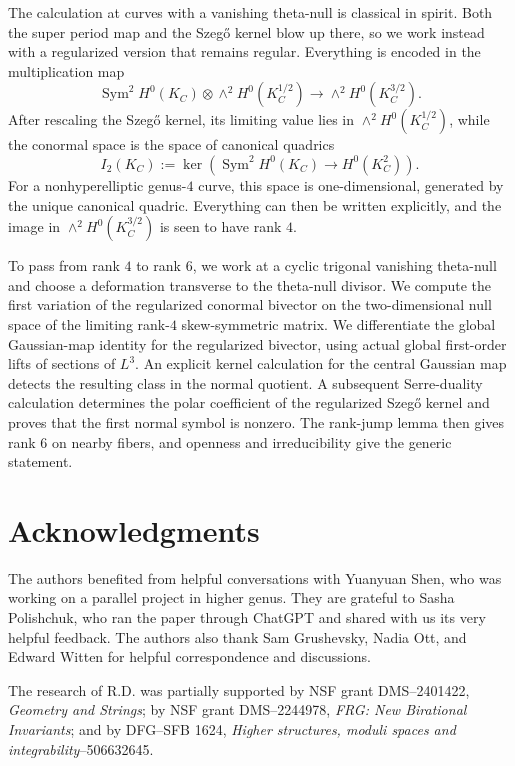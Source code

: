 \documentclass[11pt]{article}
\newcommand{\Sym}{\operatorname{Sym}}
\begin{document}
The calculation at curves with a vanishing theta-null is classical in spirit.
Both the super period map and the Szeg\H{o} kernel blow up there,
so we work instead with a regularized version that remains regular.
Everything is encoded in the multiplication map
\[
\Sym^2 H^0(K_C)\otimes \wedge^2 H^0(K_C^{1/2})
\longrightarrow
\wedge^2 H^0(K_C^{3/2}).
\]
After rescaling the Szeg\H{o} kernel, its limiting value lies in
$\wedge^2 H^0(K_C^{1/2})$, while the conormal space is the space of canonical quadrics
\[
I_2(K_C):=\ker\!\left(
\operatorname{Sym}^2 H^0(K_C)\longrightarrow H^0(K_C^2)
\right).
\]
{For a nonhyperelliptic genus-$4$ curve,} this space is one-dimensional, generated by the unique canonical quadric.
Everything can then be written explicitly, and the image in
$\wedge^2 H^0(K_C^{3/2})$ is seen to have rank $4$.

To pass from rank $4$ to rank $6$, we work at a cyclic trigonal vanishing theta-null
and choose a deformation transverse to the theta-null divisor.  We compute the first variation
of the {regularized conormal bivector} on the two-dimensional null space of the limiting rank-$4$ skew-symmetric matrix.
\begingroup
We differentiate the global Gaussian-map identity for the regularized
bivector, using actual global first-order lifts of sections of $L^3$.
An explicit kernel calculation for the central Gaussian map detects the
resulting class in the normal quotient. A subsequent Serre-duality
calculation determines the polar coefficient of the regularized
Szeg\H{o} kernel and proves that the first normal symbol is nonzero.
The rank-jump lemma then gives rank $6$ on nearby fibers, and openness
and irreducibility give the generic statement.
\endgroup


\section*{Acknowledgments}

The authors benefited from helpful conversations with Yuanyuan Shen,
who was working on a parallel project in higher genus.
They are grateful to Sasha Polishchuk, who ran the paper through ChatGPT
and shared with us its very helpful feedback.
The authors also thank Sam Grushevsky, Nadia Ott, and Edward
Witten for helpful correspondence and discussions.

The research of R.D. was partially supported 
by NSF grant DMS--2401422, \emph{Geometry and Strings};
by NSF grant DMS--2244978, \emph{FRG: New Birational Invariants}; 
and by DFG--SFB 1624, \emph{Higher structures, moduli spaces and integrability}--506632645.
\end{document}
